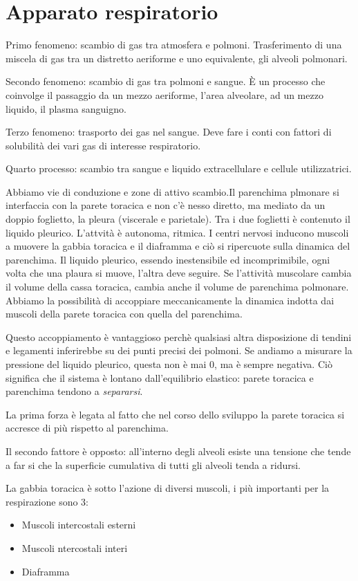 \documentclass[a4paper,12pt]{article}
\begin{document}
\section{Apparato respiratorio}
Primo fenomeno: scambio di gas tra atmosfera e polmoni. Trasferimento di una miscela di gas tra un distretto aeriforme e uno equivalente, gli alveoli polmonari.

Secondo fenomeno: scambio di gas tra polmoni e sangue. È un processo che coinvolge il passaggio da un mezzo aeriforme, l'area alveolare, ad un mezzo liquido, il plasma sanguigno. 

Terzo fenomeno: trasporto dei gas nel sangue. Deve fare i conti con fattori di solubilità dei vari gas di interesse respiratorio.

Quarto processo: scambio tra sangue e liquido extracellulare e cellule utilizzatrici.

Abbiamo vie di conduzione e zone di attivo scambio.Il parenchima plmonare si interfaccia con la parete toracica e non c'è nesso diretto, ma mediato da un doppio foglietto, la pleura (viscerale e parietale). Tra i due foglietti è contenuto il liquido pleurico. L'attvità è autonoma, ritmica. I centri nervosi inducono muscoli a muovere la gabbia toracica e il diaframma e ciò si ripercuote sulla dinamica del parenchima. Il liquido pleurico, essendo inestensibile ed incomprimibile, ogni volta che una plaura si muove, l'altra deve seguire. Se l'attività muscolare cambia il volume della cassa toracica, cambia anche il volume de parenchima polmonare. Abbiamo la possibilità di accoppiare meccanicamente la dinamica indotta dai muscoli della parete toracica con quella del parenchima.

Questo accoppiamento è vantaggioso perchè qualsiasi altra disposizione di tendini e legamenti inferirebbe su dei punti precisi dei polmoni. Se andiamo a misurare la pressione del liquido pleurico, questa non è mai 0, ma è sempre negativa. Ciò significa che il sistema è lontano dall'equilibrio elastico: parete toracica e parenchima tendono a \emph{separarsi}. 

La prima forza è legata al fatto che nel corso dello sviluppo la parete toracica si accresce di più rispetto al parenchima.

Il secondo fattore è opposto: all'interno degli alveoli esiste una tensione che tende a far si che la superficie cumulativa di tutti gli alveoli tenda a ridursi.

La gabbia toracica è sotto l'azione di diversi muscoli, i più importanti per la respirazione sono 3:
\begin{itemize}
\item{Muscoli intercostali esterni}
\item{Muscoli ntercostali interi}
\item{Diaframma}
\end{itemize}
\end{document}
